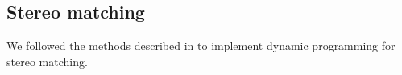 
\subsection{Stereo matching}
\label{sec:stereo}

We followed the methods described in \cite{realtimestereo} to implement dynamic programming for stereo matching.


